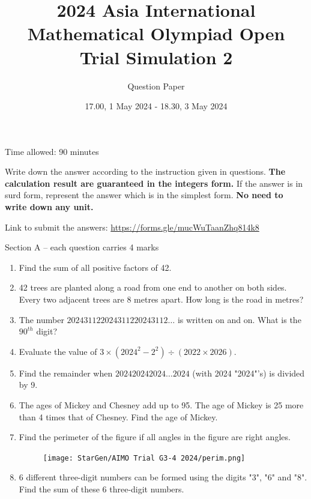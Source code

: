 \documentclass[11pt]{scrartcl}
\title{2024 Asia International Mathematical Olympiad Open Trial Simulation 2}
\author{Question Paper}
\date{17.00, 1 May 2024 - 18.30, 3 May 2024}
\begin{document}
\maketitle
\begin{center}
    \Huge
\end{center}
\vspace{3cm}

\begin{flushright}
    \huge
   Time allowed: 90 minutes
\end{flushright}

\vspace{3cm}
\normalsize
Write down the answer according to the instruction given in questions. \textbf{The calculation result are guaranteed in the integers form.} If the answer is in surd form, represent the answer which is in the simplest form. \textbf{No need to write down any unit.}

\vspace{2cm}
Link to submit the answers: \url{https://forms.gle/mucWuTaanZhq814k8}



\pagestyle{plain}
\newpage
Section A – each question carries 4 marks

\hrulefill %
\begin{enumerate}
    \item Find the sum of all positive factors of 42.
    \vspace{10cm} \item 42 trees are planted along a road from one end to another on both sides. Every two adjacent trees are 8 metres apart. How long is the road in metres?
    \vspace{10cm} \item The number $202431122024311220243112\ldots$ is written on and on. What is the $90^{th}$ digit?
    \vspace{13cm} \item Evaluate the value of $3 \times (2024^2 - 2^2) \div (2022 \times 2026)$.
    \vspace{10cm} \item Find the remainder when $202420242024\ldots2024$ (with 2024 "2024"'s) is divided by 9. 
    \vspace{13cm} \item The ages of Mickey and Chesney add up to 95. The age of Mickey is 25 more than 4 times that of Chesney. Find the age of Mickey.
    \vspace{10cm} \item Find the perimeter of the figure if all angles in the figure are right angles. 
    \begin{figure}[h]
        \centering
        \texttt{[image: StarGen/AIMO Trial G3-4 2024/perim.png]}
    \end{figure}
    \vspace{8cm} \item 6 different three-digit numbers can be formed using the digits "3", "6" and "8". Find the sum of these 6 three-digit numbers.
\end{enumerate}
\end{document}
